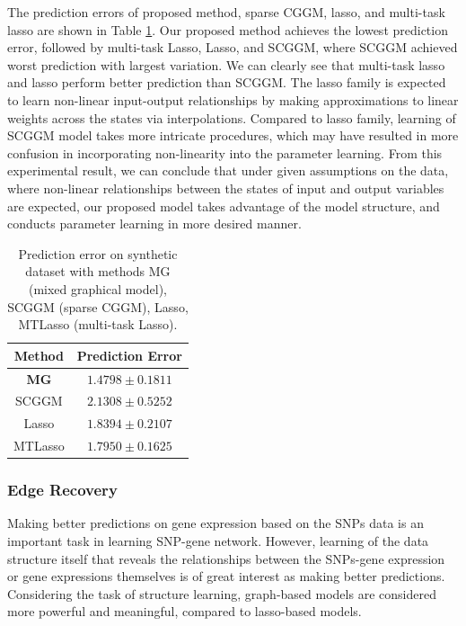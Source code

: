 \documentclass{article}
\begin{document}
The prediction errors of proposed method, sparse CGGM, lasso, and multi-task lasso are shown in Table \ref{table:syn_pred_err}.
Our proposed method achieves the lowest prediction error, followed by multi-task Lasso, Lasso, and SCGGM, where SCGGM achieved worst prediction with largest variation.
We can clearly see that multi-task lasso and lasso perform better prediction than SCGGM.
The lasso family is expected to learn non-linear input-output relationships by making approximations to linear weights across the states via interpolations.
Compared to lasso family, learning of SCGGM model takes more intricate procedures, which may have resulted in more confusion in incorporating non-linearity into the parameter learning.
From this experimental result, we can conclude that under given assumptions on the data, where non-linear relationships between the states of input and output variables are expected, our proposed model takes advantage of the model structure, and conducts parameter learning in more desired manner.



 
\begin{table}[hbtp]
\begin{center}
    \begin{tabular}{| c | c |}
    \hline
    Method & Prediction Error \\
    \hline
    \textbf{MG} & $\mathbf{1.4798 \pm 0.1811}$ \\
    SCGGM & $2.1308 \pm 0.5252$  \\
    Lasso & $1.8394 \pm 0.2107$  \\
    MTLasso & $1.7950 \pm 0.1625$ \\
    \hline 
    \end{tabular}
\end{center}
 	\caption{Prediction error on synthetic dataset with methods MG (mixed graphical model), SCGGM (sparse CGGM), Lasso, MTLasso (multi-task Lasso).}
 \label{table:syn_pred_err}
\end{table}



\subsubsection{Edge Recovery}
Making better predictions on gene expression based on the SNPs data is an important task in learning SNP-gene network. However, learning of the data structure itself that reveals the relationships between the SNPs-gene expression or gene expressions themselves is of great interest as making better predictions. Considering the task of structure learning, graph-based models are considered more powerful and meaningful, compared to lasso-based models.
\end{document}
